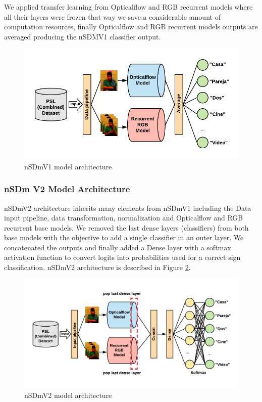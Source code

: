 \documentclass[twocolumn,conference]{article}
\begin{document}
We applied transfer learning from Opticalflow and RGB recurrent models where all their layers were frozen that way we save a considerable amount of computation resources, finally Opticalflow and RGB recurrent models outputs are averaged producing the nSDMV1 classifier output.

\begin{figure}[hbt!]
\centering
\includegraphics[scale=1.0]{images/nsdm-model-architecture.png}
\caption{nSDmV1 model architecture}
\label{fig:ndsm-v1-architecture}
\end{figure}

\subsubsection{nSDm V2 Model Architecture}\label{nsdmv2-architecture}

nSDmV2 architecture inherits many elements from nSDmV1 including the Data input pipeline, data transformation, normalization and Opticalflow and RGB recurrent base models. We removed the last dense layers (classifiers) from both base models with the objective to add a single classifier in an outer layer. We concatenated the outputs and finally added a Dense layer with a softmax activation function to convert logits into probabilities used for a correct sign classification. nSDmV2 architecture is described in Figure \ref{fig:ndsm-v2-architecture}.

\begin{figure}[hbt!]
\centering
\includegraphics[scale=1.0]{images/nsdm-model-architecture-v2.png}
\caption{nSDmV2 model architecture}
\label{fig:ndsm-v2-architecture}
\end{figure}
\end{document}
